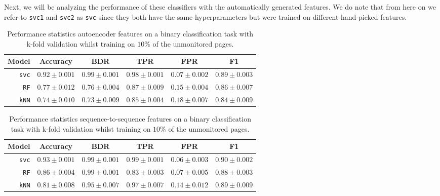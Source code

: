 Next, we will be analyzing the performance of these classifiers with the automatically generated features.
We do note that from here on we refer to \texttt{svc1} and \texttt{svc2} as \texttt{svc} since they both have the same hyperparameters but were trained on different hand-picked features.

\begin{table}[ht]
  \centering
  \begin{tabular}{ r  r  r  r  r  r } \hline
    \multicolumn{1}{c}{\textbf{Model}} & \multicolumn{1}{c}{\textbf{Accuracy}} & \multicolumn{1}{c}{\textbf{BDR}} & \multicolumn{1}{c}{\textbf{TPR}} &
      \multicolumn{1}{c}{\textbf{FPR}} & \multicolumn{1}{c}{\textbf{F1}} \\ \hline

    \texttt{svc} & $0.92 \pm 0.001$ & $0.99 \pm 0.001$ & $0.98 \pm 0.001$ & $0.07 \pm 0.002$ & $0.89 \pm 0.003$ \\

    \texttt{RF} & $0.77 \pm 0.012$ & $0.76 \pm 0.004$ & $0.87 \pm 0.009$ & $0.15 \pm 0.004$ & $0.86 \pm 0.007$ \\

    \texttt{kNN} & $0.74 \pm 0.010$ & $0.73 \pm 0.009$ & $0.85 \pm 0.004$ & $0.18 \pm 0.007$ & $0.84 \pm 0.009$ \\

    \hline
  \end{tabular}
  \caption{Performance statistics autoencoder features on a binary classification task with k-fold validation whilst training on $10\%$ of the unmonitored pages.}
  \label{table:ae-bin}
\end{table}

\begin{table}[ht]
  \centering
  \begin{tabular}{ r  r  r  r  r  r } \hline
    \multicolumn{1}{c}{\textbf{Model}} & \multicolumn{1}{c}{\textbf{Accuracy}} & \multicolumn{1}{c}{\textbf{BDR}} & \multicolumn{1}{c}{\textbf{TPR}} &
      \multicolumn{1}{c}{\textbf{FPR}} & \multicolumn{1}{c}{\textbf{F1}} \\ \hline

    \texttt{svc} & $0.93 \pm 0.001$ & $0.99 \pm 0.001$ & $0.99 \pm 0.001$ & $0.06 \pm 0.003$ & $0.90 \pm 0.002$ \\

    \texttt{RF} & $0.86 \pm 0.004$ & $0.99 \pm 0.001$ & $0.83 \pm 0.003$ & $0.07 \pm 0.005$ & $0.88 \pm 0.003$ \\

    \texttt{kNN} & $0.81 \pm 0.008$ & $0.95 \pm 0.007$ & $0.97 \pm 0.007$ & $0.14 \pm 0.012$ & $0.89 \pm 0.009$ \\

    \hline
  \end{tabular}
  \caption{Performance statistics sequence-to-sequence features on a binary classification task with k-fold validation whilst training on $10\%$ of the unmonitored pages.}
  \label{table:seq2seq-bin}
\end{table}

